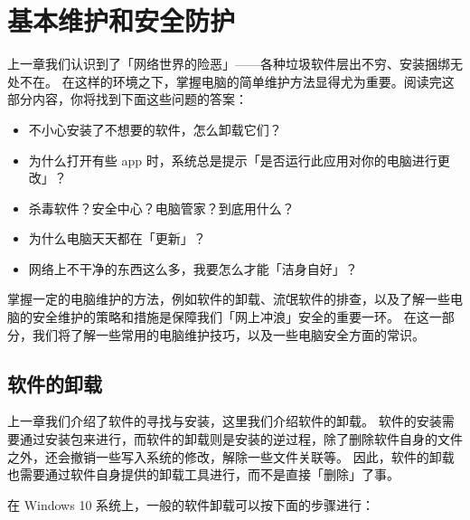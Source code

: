 \chapter{基本维护和安全防护}
\label{basic-maintenance}

\begin{intro}
  上一章我们认识到了「网络世界的险恶」——各种垃圾软件层出不穷、安装捆绑无处不在。
  在这样的环境之下，掌握电脑的简单维护方法显得尤为重要。阅读完这部分内容，你将找到下面这些问题的答案：
  \begin{itemize}
    \item 不小心安装了不想要的软件，怎么卸载它们？
    \item 为什么打开有些 app 时，系统总是提示「是否运行此应用对你的电脑进行更改」？
    \item 杀毒软件？安全中心？电脑管家？到底用什么？
    \item 为什么电脑天天都在「更新」？
    \item 网络上不干净的东西这么多，我要怎么才能「洁身自好」？
  \end{itemize}
\end{intro}

掌握一定的电脑维护的方法，例如软件的卸载、流氓软件的排查，以及了解一些电脑的安全维护的策略和措施是保障我们「网上冲浪」安全的重要一环。
在这一部分，我们将了解一些常用的电脑维护技巧，以及一些电脑安全方面的常识。

\section{软件的卸载}

上一章我们介绍了软件的寻找与安装，这里我们介绍软件的卸载。
软件的安装需要通过安装包来进行，而软件的卸载则是安装的逆过程，除了删除软件自身的文件之外，还会撤销一些写入系统的修改，解除一些文件关联等。
因此，软件的卸载也需要通过软件自身提供的卸载工具进行，而不是直接「删除」了事。

在 Windows 10 系统上，一般的软件卸载可以按下面的步骤进行：

